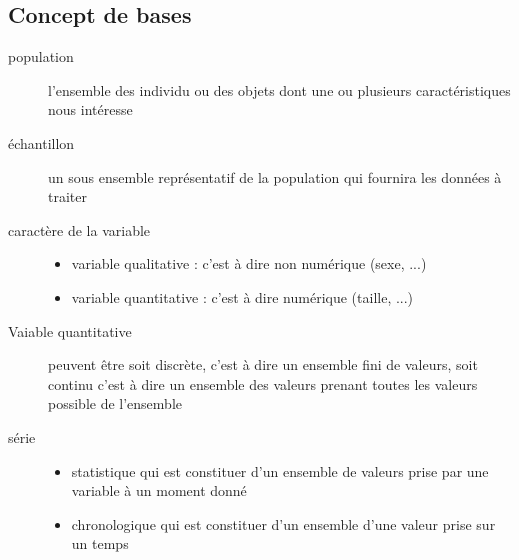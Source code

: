 \documentclass[a4paper,12pt]{article}
\begin{document}
\subsection{Concept de bases}
\begin{description}%
   \item[population] l'ensemble des individu ou des objets dont une ou plusieurs caractéristiques nous intéresse 
   \item[échantillon] un sous ensemble représentatif de la population qui fournira les données à traiter
   \item[caractère de la variable] 
        \begin{itemize}%
            \item variable qualitative : c'est à dire non numérique (sexe, ...)
            \item variable quantitative : c'est à dire numérique (taille, ...)
        \end{itemize}
   \item[Vaiable quantitative] peuvent être soit discrète, c'est à dire un ensemble fini de valeurs, soit continu c'est à dire un ensemble des valeurs prenant toutes les valeurs possible de l'ensemble
   \item[série] 
        \begin{itemize}%
            \item statistique qui est constituer d'un ensemble de valeurs prise par une variable à un moment donné
            \item  chronologique qui est constituer d'un ensemble d'une valeur prise sur un temps
        \end{itemize}
\end{description}
\end{document}
